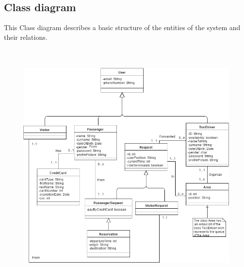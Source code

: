 \documentclass[18pt,oneside,a4paper, titlepage]{article}
\begin{document}
	\subsection{Class diagram}
	This Class diagram describes a basic structure of the entities of the system and their relations.
	\\ \\ \\ 
	\begin{figure}[h]
		\includegraphics[scale=0.55]{Diagrams/classDiagram.png}
	\end{figure}
\newpage
\end{document}
